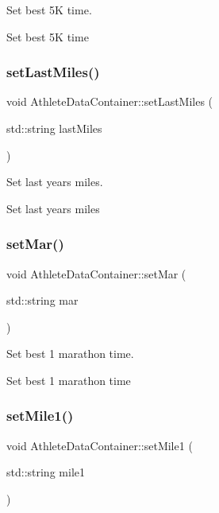 Set best 5K time. 

Set best 5K time \mbox{\label{classAthleteDataContainer_a1d459adc89cbc743be440bbbc162dddd}} 
\subsubsection{\texorpdfstring{setLastMiles()}{setLastMiles()}}
{\footnotesize\ttfamily void Athlete\+Data\+Container\+::set\+Last\+Miles (\begin{DoxyParamCaption}\item[{std\+::string}]{last\+Miles }\end{DoxyParamCaption})}



Set last years miles. 

Set last years miles \mbox{\label{classAthleteDataContainer_aaac0e27d4a706b540a2f63b63e3640e2}} 
\subsubsection{\texorpdfstring{setMar()}{setMar()}}
{\footnotesize\ttfamily void Athlete\+Data\+Container\+::set\+Mar (\begin{DoxyParamCaption}\item[{std\+::string}]{mar }\end{DoxyParamCaption})}



Set best 1 marathon time. 

Set best 1 marathon time \mbox{\label{classAthleteDataContainer_a30b1252a22911e82aa08cfef505b0952}} 
\subsubsection{\texorpdfstring{setMile1()}{setMile1()}}
{\footnotesize\ttfamily void Athlete\+Data\+Container\+::set\+Mile1 (\begin{DoxyParamCaption}\item[{std\+::string}]{mile1 }\end{DoxyParamCaption})}




